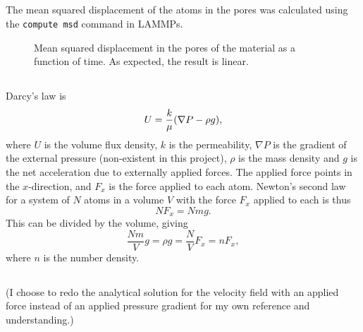 \documentclass[11pt,british,a4paper]{report}
\begin{document}
\subsection{}
The mean squared displacement of the atoms in the pores was calculated using the \texttt{compute msd} command in LAMMPs.
\begin{figure}[tbh]
    \centering
    \caption{Mean squared displacement in the pores of the material as a function of time. As expected, the result is linear.}%
    \label{fig:msdpores}
\end{figure}

\subsection{}
Darcy's law is
\begin{equation}
    U = \frac{k}{\mu}\qty(\nabla P - \rho g),
\end{equation}
where \(U\) is the volume flux density, \(k\) is the permeability, \(\nabla P\) is the gradient of the external pressure (non-existent in this project), \(\rho\) is the mass density and \(g\) is the net acceleration due to externally applied forces. The applied force points in the \(x\)-direction, and \(F_x\) is the force applied to each atom. Newton's second law for a system of \(N\) atoms in a volume \(V\) with the force \(F_x\) applied to each is thus
\begin{equation}
    NF_x = Nmg.
\end{equation}
This can be divided by the volume, giving
\begin{equation}
    \frac{Nm}{V}g = \rho g = \frac{N}{V}F_x = nF_x,
\end{equation}
where \(n\) is the number density.

\subsection{}
(I choose to redo the analytical solution for the velocity field with an applied force instead of an applied pressure gradient for my own reference and understanding.)
\end{document}
